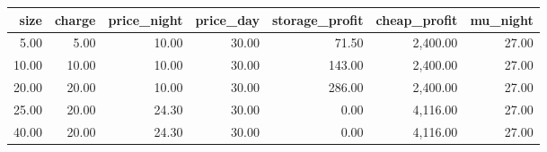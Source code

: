 \begin{tabular}{rrrrrrr}
\toprule
size & charge & price\_night & price\_day & storage\_profit & cheap\_profit & mu\_night \\
\midrule
5.00 & 5.00 & 10.00 & 30.00 & 71.50 & 2,400.00 & 27.00 \\
10.00 & 10.00 & 10.00 & 30.00 & 143.00 & 2,400.00 & 27.00 \\
20.00 & 20.00 & 10.00 & 30.00 & 286.00 & 2,400.00 & 27.00 \\
25.00 & 20.00 & 24.30 & 30.00 & 0.00 & 4,116.00 & 27.00 \\
40.00 & 20.00 & 24.30 & 30.00 & 0.00 & 4,116.00 & 27.00 \\
\bottomrule
\end{tabular}

